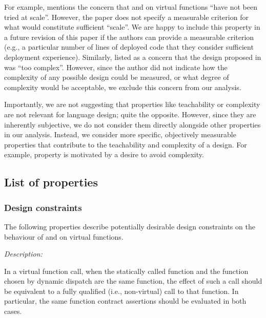 For example, \cite{P3573R0} mentions the concern that  and  on virtual functions ``have not been tried at scale''. However, the paper does not specify a measurable criterion for what would constitute sufficient ``scale''. We are happy to include this property in a future revision of this paper if the authors can provide a measurable criterion (e.g., a particular number of lines of deployed code that they consider sufficient deployment experience). Similarly, \cite{P3506R0} listed as a concern that the design proposed in \cite{P3097R0} was ``too complex''. However, since the author did not indicate how the complexity of any possible design could be measured, or what degree of complexity would be acceptable, we exclude this concern from our analysis.

Importantly, we are not suggesting that properties like teachability or complexity are not relevant for language design; quite the opposite. However, since they are inherently subjective, we do not consider them directly alongside other properties in our analysis. Instead, we consider more specific, objectively measurable properties that contribute to the teachability and complexity of a design. For example, property  is motivated by a desire to avoid complexity.

\subsection{List of properties}

\subsubsection{Design constraints}

The following properties describe potentially desirable design constraints on the behaviour of  and  on virtual functions.




\emph{Description:}

In a virtual function call, when the statically called function and the function chosen by dynamic dispatch are the same function, the effect of such a call should be equivalent to a fully qualified (i.e., non-virtual) call to that function. In particular, the same function contract assertions should be evaluated in both cases.

